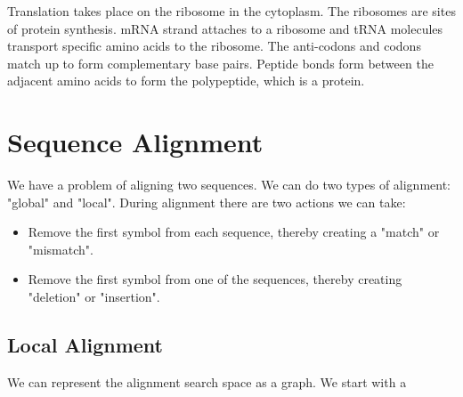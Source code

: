 \documentclass{report}
\begin{document}
Translation takes place on the ribosome in the cytoplasm.
The ribosomes are sites of protein synthesis.
mRNA strand attaches to a ribosome and tRNA molecules transport specific amino acids to the ribosome.
The anti-codons and codons match up to form complementary base pairs.
Peptide bonds form between the adjacent amino acids to form the polypeptide, which is a protein.

\chapter{Sequence Alignment}
We have a problem of aligning two sequences.
We can do two types of alignment: "global" and "local".
During alignment there are two actions we can take:
\begin{itemize}
\item Remove the first symbol from each sequence, thereby creating a "match" or "mismatch".
\item Remove the first symbol from one of the sequences, thereby creating "deletion" or "insertion".
\end{itemize}
\section{Local Alignment}
We can represent the alignment search space as a graph.
We start with a 
\end{document}
